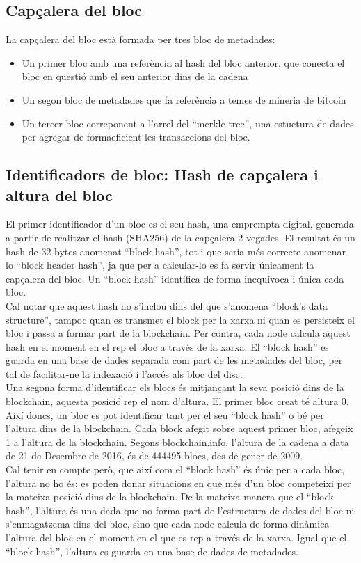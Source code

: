 \subsection{Capçalera del bloc}
La capçalera del bloc està formada per tres bloc de metadades: 
\begin{itemize}
    \item Un primer bloc amb una referència al hash del bloc anterior, que conecta el bloc en qüestió amb el seu anterior dins de la cadena
    \item  Un segon bloc de metadades que fa referència a temes de mineria de bitcoin
    \item Un tercer bloc correponent a l’arrel del “merkle tree”, una estuctura de dades per agregar de formaeficient les transaccions del bloc.
\end{itemize}

\subsection{Identificadors de bloc: Hash de capçalera i altura del bloc}
El primer identificador d’un bloc es el seu hash, una emprempta digital, generada a partir de realitzar el hash (SHA256) de la capçalera 2 vegades. El resultat és un hash de 32 bytes anomenat “block hash”, tot i que seria més correcte anomenar-lo “block header hash”, ja que per a calcular-lo es fa servir únicament la capçalera del bloc. Un “block hash” identifica de forma inequívoca i única cada bloc.\\
\newline Cal notar que aquest hash no s’inclou dins del que s’anomena “block’s data structure”, tampoc quan es transmet el block per la xarxa ni quan es persisteix el bloc i passa a formar part de la blockchain. Per contra, cada node calcula aquest hash en el moment en el rep el bloc a través de la xarxa. El “block hash” es guarda en una base de dades separada com part de les metadades del bloc, per tal de facilitar-ne la indexació i l’accés als bloc del disc.\\
\newline Una segona forma d’identificar els blocs és mitjançant la seva posició dins de la blockchain, aquesta posició rep el nom d’altura. El primer bloc creat té altura 0. 
Així doncs, un bloc es pot identificar tant per el seu “block hash” o bé per l’altura dins de la blockchain. Cada block afegit sobre aquest primer bloc, afegeix 1 a l’altura de la blockchain. Segons blockchain.info, l’altura de la cadena a data de 21 de Desembre de 2016, és de 444495 blocs, des de gener de 2009.\\
\newline Cal tenir en compte però, que així com el “block hash” és únic per a cada bloc, l’altura no ho és; es poden donar situacions en que més d’un bloc competeixi per la mateixa posició dins de la blockchain. 
De la mateixa manera que el “block hash”, l’altura és una dada que no forma part de l’estructura de dades del bloc ni s’enmagatzema dins del bloc, sino que cada node calcula de forma dinàmica l’altura del bloc en el moment en el que es rep a través de la xarxa. Igual que el “block hash”, l’altura es guarda en una base de dades de metadades.

   

